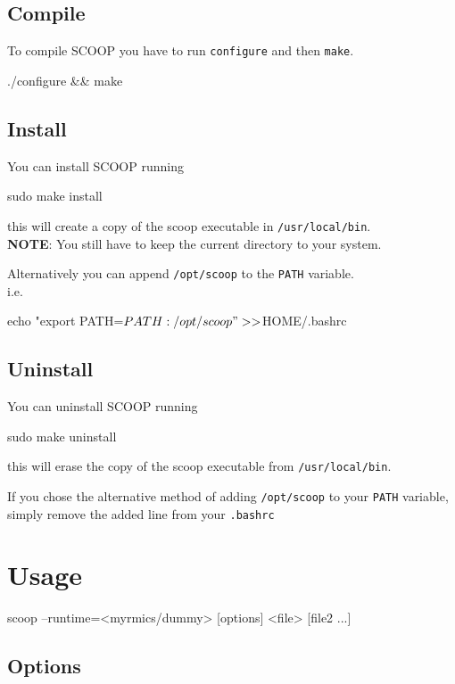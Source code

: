 \documentclass[
a4paper,
12pt,
]{article}
\begin{document}
\subsection{Compile}
To compile SCOOP you have to run \verb!configure! and then \verb!make!.
\begin{bash}
  ./configure && make
\end{bash}

\subsection{Install}
You can install SCOOP running
\begin{bash}
  sudo make install
\end{bash}
this will create a copy of the scoop executable in
\verb!/usr/local/bin!.\\
\textbf{NOTE}: You still have to keep the current directory to your system.

Alternatively you can append \verb!/opt/scoop! to the \verb!PATH!
variable.\\
i.e.
\begin{bash}
  echo "export PATH=$PATH:/opt/scoop" >> $HOME/.bashrc
\end{bash}

\subsection{Uninstall}

You can uninstall SCOOP running
\begin{bash}
  sudo make uninstall
\end{bash}
this will erase the copy of the scoop executable from
\verb!/usr/local/bin!.

If you chose the alternative method of adding \verb!/opt/scoop! to
your \verb!PATH! variable, simply remove the added line from your \verb!.bashrc!

\section{Usage}

\begin{bash}
  scoop --runtime=<myrmics/dummy> [options] <file> [file2 ...]
\end{bash}

\subsection{Options}
\end{document}
